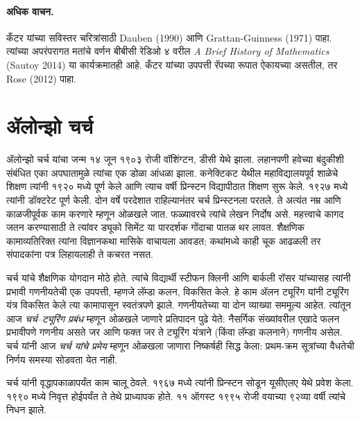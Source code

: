 \paragraph{अधिक वाचन.}
कँटर यांच्या सविस्तर चरित्रांसाठी Dauben (1990) आणि Grattan-Guinness (1971) पाहा. त्यांच्या अपरंपरागत मतांचे वर्णन बीबीसी रेडिओ ४ वरील \emph{A Brief History of Mathematics} (Sautoy 2014) या कार्यक्रमातही आहे. कँटर यांच्या उपपत्ती रॅपच्या रूपात ऐकायच्या असतील, तर Rose (2012) पाहा.













\section{ॲलोन्झो चर्च}\label{his:bio:chu:sec}



ॲलोन्झो चर्च यांचा जन्म १४ जून १९०३ रोजी वॉशिंग्टन, डीसी येथे झाला. लहानपणी हवेच्या बंदुकीशी संबंधित एका अपघातामुळे त्यांचा एक डोळा आंधळा झाला. कनेक्टिकट येथील महाविद्यालयपूर्व शाळेचे शिक्षण त्यांनी १९२० मध्ये पूर्ण केले आणि त्याच वर्षी प्रिन्स्टन विद्यापीठात शिक्षण सुरू केले. १९२७ मध्ये त्यांनी डॉक्टरेट पूर्ण केली. दोन वर्षे परदेशात राहिल्यानंतर चर्च प्रिन्स्टनला परतले. ते अत्यंत नम्र आणि काळजीपूर्वक काम करणारे म्हणून ओळखले जात. फळ्यावरचे त्यांचे लेखन निर्दोष असे. महत्त्वाचे कागद जतन करण्यासाठी ते त्यांवर ड्यूको सिमेंट या पारदर्शक गोंदाचा पातळ थर लावत. शैक्षणिक कामाव्यतिरिक्त त्यांना विज्ञानकथा मासिके वाचायला आवडत; कथांमध्ये काही चूक आढळली तर संपादकांना पत्र लिहायलाही ते कचरत नसत.

चर्च यांचे शैक्षणिक योगदान मोठे होते. त्यांचे विद्यार्थी स्टीफन क्लिनी आणि बार्कली रॉसर यांच्यासह त्यांनी प्रभावी गणनीयतेची एक उपपत्ती, म्हणजे लॅम्डा कलन, विकसित केले. हे काम ॲलन ट्यूरिंग यांनी ट्यूरिंग यंत्र विकसित केले त्या कामापासून स्वतंत्रपणे झाले. गणनीयतेच्या या दोन व्याख्या सममूल्य आहेत. त्यांतून आज \emph{चर्च–ट्यूरिंग प्रबंध} म्हणून ओळखले जाणारे प्रतिपादन पुढे येते: नैसर्गिक संख्यांवरील एखादे फलन प्रभावीपणे गणनीय असते जर आणि फक्त जर ते ट्यूरिंग यंत्राने (किंवा लॅम्डा कलनाने) गणनीय असेल. चर्च यांनी आज \emph{चर्च यांचे प्रमेय} म्हणून ओळखला जाणारा निष्कर्षही सिद्ध केला: प्रथम-क्रम सूत्रांच्या वैधतेची निर्णय समस्या सोडवता येत नाही.

चर्च यांनी वृद्धापकाळापर्यंत काम चालू ठेवले. १९६७ मध्ये त्यांनी प्रिन्स्टन सोडून यूसीएलए येथे प्रवेश केला. १९९० मध्ये निवृत्त होईपर्यंत ते तेथे प्राध्यापक होते. ११ ऑगस्ट १९९५ रोजी वयाच्या ९२व्या वर्षी त्यांचे निधन झाले.

